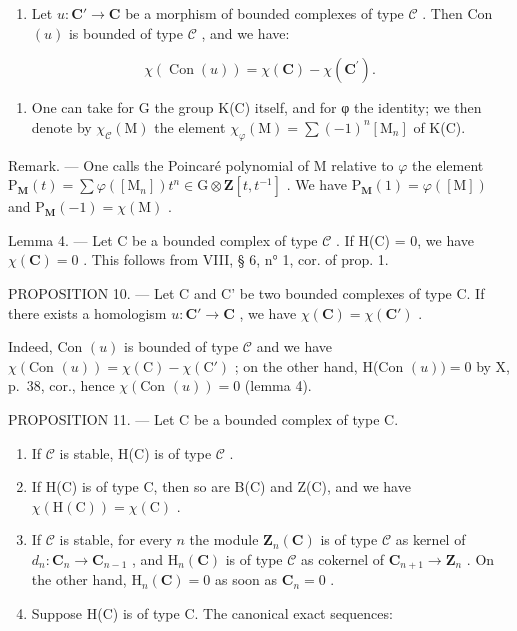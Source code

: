\begin{enumerate}
\def\labelenumi{\arabic{enumi})}
\setcounter{enumi}{4}
\tightlist
\item
  Let \(u: \mathbf{C}' \to \mathbf{C}\) be a morphism of bounded complexes of type \(\mathcal{C}\) . Then Con \((u)\) is bounded of type \(\mathcal{C}\) , and we have:
\end{enumerate}

\[
\chi (\operatorname{Con} (u)) = \chi (\mathbf {C}) - \chi (\mathbf {C} ^ {\prime}).
\]

\begin{enumerate}
\def\labelenumi{\arabic{enumi})}
\setcounter{enumi}{5}
\tightlist
\item
  One can take for G the group K(C) itself, and for φ the identity; we then denote by \(\chi_{\mathcal{C}}(\mathrm{M})\) the element \(\chi_{\varphi}(\mathrm{M}) = \sum (-1)^{n}[\mathrm{M}_{n}]\) of K(C).
\end{enumerate}

Remark. --- One calls the Poincaré polynomial of M relative to \(\varphi\) the element \(\mathrm{P}_{\mathbf{M}}(t) = \sum \varphi([\mathrm{M}_{n}]) t^{n} \in \mathrm{G} \otimes \mathbf{Z}[t, t^{-1}]\) . We have \(\mathrm{P}_{\mathbf{M}}(1) = \varphi([\mathrm{M}])\) and \(\mathrm{P}_{\mathbf{M}}(-1) = \chi(\mathrm{M})\) .

Lemma 4. --- Let C be a bounded complex of type \(\mathcal{C}\) . If H(C) = 0, we have \(\chi(\mathbf{C}) = 0\) . This follows from VIII, § 6, n° 1, cor. of prop. 1.

PROPOSITION 10. --- Let C and C' be two bounded complexes of type C. If there exists a homologism \(u: \mathbf{C}' \to \mathbf{C}\) , we have \(\chi(\mathbf{C}) = \chi(\mathbf{C}')\) .

Indeed, Con \((u)\) is bounded of type \(\mathcal{C}\) and we have \(\chi(\text{Con } (u)) = \chi(\text{C}) - \chi(\text{C}')\) ; on the other hand, H(Con \((u)) = 0\) by X, p.~38, cor., hence \(\chi(\text{Con } (u)) = 0\) (lemma 4).

PROPOSITION 11. --- Let C be a bounded complex of type C.

\begin{enumerate}
\def\labelenumi{\alph{enumi})}
\item
  If \(\mathcal{C}\) is stable, H(C) is of type \(\mathcal{C}\) .
\item
  If H(C) is of type C, then so are B(C) and Z(C), and we have \(\chi(\mathrm{H}(\mathrm{C})) = \chi(\mathrm{C})\) .
\item
  If \(\mathcal{C}\) is stable, for every \(n\) the module \(\mathbf{Z}_n(\mathbf{C})\) is of type \(\mathcal{C}\) as kernel of \(d_n: \mathbf{C}_n \to \mathbf{C}_{n-1}\) , and \(\mathrm{H}_n(\mathbf{C})\) is of type \(\mathcal{C}\) as cokernel of \(\mathbf{C}_{n+1} \to \mathbf{Z}_n\) . On the other hand, \(\mathrm{H}_n(\mathbf{C}) = 0\) as soon as \(\mathbf{C}_n = 0\) .
\item
  Suppose H(C) is of type C. The canonical exact sequences:
\end{enumerate}

